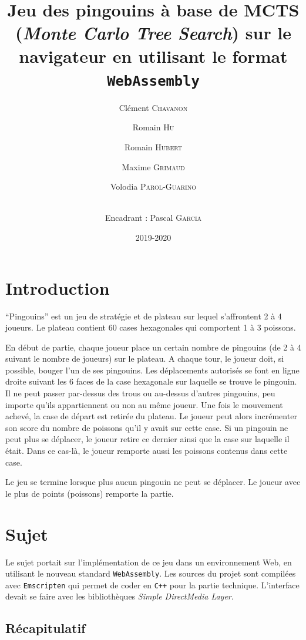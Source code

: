 \documentclass[a4paper,11pt]{article}
\title{\textbf{Jeu des pingouins à base de MCTS (\emph{Monte Carlo Tree Search}) sur le
navigateur en utilisant le format \texttt{WebAssembly}}}
\author{Clément \textsc{Chavanon} \and Romain \textsc{Hu} \and Romain \textsc{Hubert} \and Maxime \textsc{Grimaud} \and Volodia \textsc{Parol-Guarino} \and 
 \\ Encadrant : Pascal \textsc{Garcia}}
\date{2019-2020}
\begin{document}
\maketitle
\begin{abstract}

\end{abstract}

\section*{Introduction}\label{introduction}

``Pingouins'' est un jeu de stratégie et de plateau sur lequel
s'affrontent 2 à 4 joueurs. Le plateau contient 60 cases hexagonales qui
comportent 1 à 3 poissons.

En début de partie, chaque joueur place un certain nombre de pingouins
(de 2 à 4 suivant le nombre de joueurs) sur le plateau. A chaque tour,
le joueur doit, si possible, bouger l'un de ses pingouins. Les
déplacements autorisés se font en ligne droite suivant les 6 faces de la
case hexagonale sur laquelle se trouve le pingouin. Il ne peut passer
par-dessus des trous ou au-dessus d'autres pingouins, peu importe qu'ils
appartiennent ou non au même joueur. Une fois le mouvement achevé, la
case de départ est retirée du plateau. Le joueur peut alors incrémenter
son score du nombre de poissons qu'il y avait sur cette case. Si un
pingouin ne peut plus se déplacer, le joueur retire ce dernier ainsi que
la case sur laquelle il était. Dans ce cas-là, le joueur remporte aussi
les poissons contenus dans cette case.

Le jeu se termine lorsque plus aucun pingouin ne peut se déplacer. Le
joueur avec le plus de points (poissons) remporte la partie.

\section{Sujet}\label{sujet}

Le sujet portait sur l'implémentation de ce jeu dans un environnement
Web, en utilisant le nouveau standard \texttt{WebAssembly}. Les sources
du projet sont compilées avec \texttt{Emscripten} qui permet de coder en
\texttt{C++} pour la partie technique. L'interface devait se faire avec
les bibliothèques \emph{Simple DirectMedia Layer}.

\subsection{Récapitulatif}\label{ruxe9capitulatif}
\end{document}
